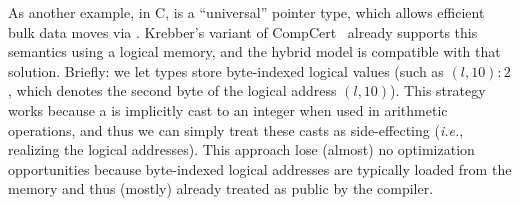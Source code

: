 As another example, in C,  is a ``universal'' pointer type, which allows
efficient bulk data moves via .  Krebber's variant of
CompCert~\cite{krebbers2014formal} already supports this semantics using a logical
memory, and the hybrid model is compatible with that solution.
Briefly: we let  types store byte-indexed logical values
(such as $(l,10)\!:\!2$, which denotes the second byte of the logical
address $(l,10)$). This strategy works because a  is
implicitly cast to an integer when used in arithmetic operations,
and thus we
can simply treat these casts as side-effecting (\textit{i.e.},
realizing the logical addresses).  This approach lose (almost) no
optimization opportunities because byte-indexed logical addresses
are typically loaded from the memory and 
thus (mostly) already treated as public by the compiler.









